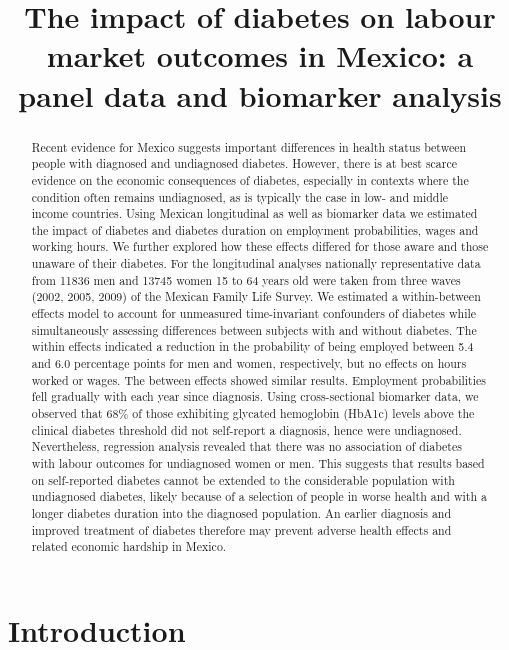 \documentclass[12pt,english]{article}
\begin{document}
	\title{The impact of diabetes on labour market outcomes in Mexico: a panel data and biomarker analysis}
	\author{}
	\date{}
	\maketitle 
	\thispagestyle{empty}
	\clearpage

	
\begin{abstract}
Recent evidence for Mexico suggests important differences in health status between people with diagnosed and undiagnosed diabetes. However, there is at best scarce evidence on the economic consequences of diabetes, especially in contexts where the condition often remains undiagnosed, as is typically the case in low- and middle income countries. Using Mexican longitudinal as well as biomarker data we estimated the impact of diabetes and diabetes duration on employment probabilities, wages and working hours. We further explored how these effects differed for those aware and those unaware of their diabetes. For the longitudinal analyses nationally representative data from 11836 men and 13745 women 15 to 64 years old were taken from three waves (2002, 2005, 2009) of the Mexican Family Life Survey. We estimated a within-between effects model to account for unmeasured time-invariant confounders of diabetes while simultaneously assessing differences between subjects with and without diabetes. The within effects indicated a reduction in the probability of being employed between 5.4 and 6.0 percentage points for men and women, respectively, but no effects on hours worked or wages. The between effects showed similar results. Employment probabilities fell gradually with each year since diagnosis. Using cross-sectional biomarker data, we observed that 68\% of those exhibiting glycated hemoglobin (HbA1c) levels above the clinical diabetes threshold did not self-report a diagnosis, hence were undiagnosed. Nevertheless, regression analysis revealed that there was no association of diabetes with labour outcomes for undiagnosed women or men. This suggests that results based on self-reported diabetes cannot be extended to the considerable population with undiagnosed diabetes, likely because of a selection of people in worse health and with a longer diabetes duration into the diagnosed population. An earlier diagnosis and improved treatment of diabetes therefore may prevent adverse health effects and related economic hardship in Mexico.
\end{abstract}


\section{\label{sec:Introduction}Introduction }
\end{document}
